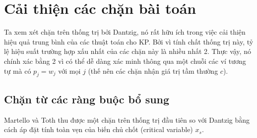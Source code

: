 \section{Cải thiện các chặn bài toán}

Ta xem xét chặn trên thống trị bởi Dantzig, nó rất hữu ích trong việc cải thiện hiệu quả trung bình của các thuật toán cho KP. Bởi vì tính chất thống trị này, tỷ lệ hiệu suất trường hợp xấu nhất của các chặn này là nhiều nhất 2. Thực vậy, nó chính xác bằng 2 vì có thể dễ dàng xác minh thông qua một chuỗi các ví tương tự mà có $p_j = w_j$ với mọi $j$ (thế nên các chặn nhận giá trị tầm thường $c$).

\subsection{Chặn từ các ràng buộc bổ sung}

Martello và Toth thu được một chặn trên thống trị đầu tiên so với Dantzig bằng cách áp đặt tính toàn vẹn của biến chủ chốt (critical variable) $x_s$.

